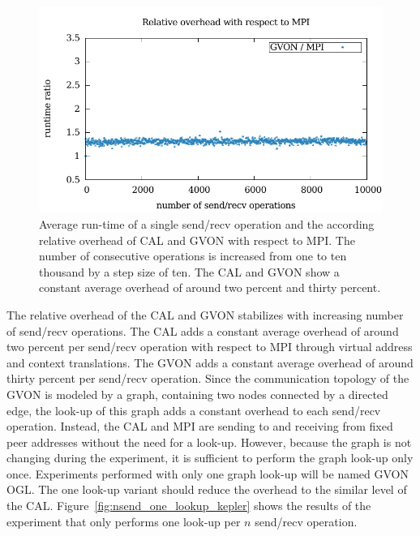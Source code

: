 \begin{figure}[H]
\begin{minipage}[t]{0.5\textwidth}
    \includegraphics[width=\textwidth]{plots/50_nsend_overhead_gvon}
  \end{minipage}%
  \caption{Average run-time of a single send/recv operation and the
    according relative overhead of CAL and GVON with respect to
    MPI. The number of consecutive operations is increased from one to
    ten thousand by a step size of ten. The CAL and GVON show a
    constant average overhead of around two percent and thirty percent.}
  \label{fig:nsend_kepler}
\end{figure}

\noindent The relative overhead of the CAL and GVON stabilizes with
increasing number of send/recv operations.  The CAL adds a constant
average overhead of around two percent per send/recv operation with
respect to MPI through virtual address and context translations. The
GVON adds a constant average overhead of around thirty percent per
send/recv operation. Since the communication topology of the GVON is
modeled by a graph, containing two nodes connected by a directed edge,
the look-up of this graph adds a constant overhead to each
send/recv operation.  Instead, the CAL and MPI are sending to and
receiving from fixed peer addresses without the need for a look-up.
However, because the graph is not changing during the experiment, it
is sufficient to perform the graph look-up only once. Experiments
performed with only one graph look-up will be named GVON OGL. The one
look-up variant should reduce the overhead to the similar level of
the CAL. Figure~\ref{fig:nsend_one_lookup_kepler} shows the results of
the experiment that only performs one look-up per $n$ send/recv
operation.

